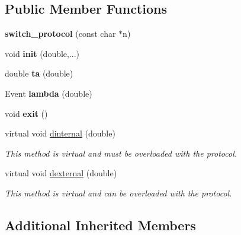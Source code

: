 \subsection*{Public Member Functions}
\begin{DoxyCompactItemize}
\item 
{\bfseries switch\+\_\+protocol} (const char $\ast$n)\hypertarget{classswitch__protocol_a037a81b094ccb233381c4ec1946ddf9e}{}\label{classswitch__protocol_a037a81b094ccb233381c4ec1946ddf9e}

\item 
void {\bfseries init} (double,...)\hypertarget{classswitch__protocol_a30d2fd8c73d49279d47575ead34b814b}{}\label{classswitch__protocol_a30d2fd8c73d49279d47575ead34b814b}

\item 
double {\bfseries ta} (double)\hypertarget{classswitch__protocol_aeeb0a3aff7b4adc03f328b3b22eba76f}{}\label{classswitch__protocol_aeeb0a3aff7b4adc03f328b3b22eba76f}

\item 
Event {\bfseries lambda} (double)\hypertarget{classswitch__protocol_a359850b42911d74507b5a9bc3de689ea}{}\label{classswitch__protocol_a359850b42911d74507b5a9bc3de689ea}

\item 
void {\bfseries exit} ()\hypertarget{classswitch__protocol_a508f4ca6ad0341274a3b274a2610fb8c}{}\label{classswitch__protocol_a508f4ca6ad0341274a3b274a2610fb8c}

\item 
virtual void \hyperlink{classswitch__protocol_a7dd0e54d6b2a3683a5be387cffa99a22}{dinternal} (double)
\begin{DoxyCompactList}\small\item\em This method is virtual and must be overloaded with the protocol. \end{DoxyCompactList}\item 
virtual void \hyperlink{classswitch__protocol_a93b0465ace315872626f2f04c29b55f3}{dexternal} (double)
\begin{DoxyCompactList}\small\item\em This method is virtual and can be overloaded with the protocol. \end{DoxyCompactList}\end{DoxyCompactItemize}
\subsection*{Additional Inherited Members}


